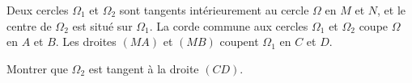 Deux cercles $\Omega_{1}$ et $\Omega_{2}$ sont tangents intérieurement au cercle $\Omega$ en $M$ et $N$, et le centre de $\Omega_{2}$ est situé sur $\Omega_{1}$. La corde commune aux cercles $\Omega_{1}$ et $\Omega_{2}$ coupe $\Omega$ en $A$ et $B$. Les droites $(MA)$ et $(MB)$ coupent $\Omega_{1}$ en $C$ et $D$.

Montrer que $\Omega_{2}$ est tangent à la droite $(CD)$.
